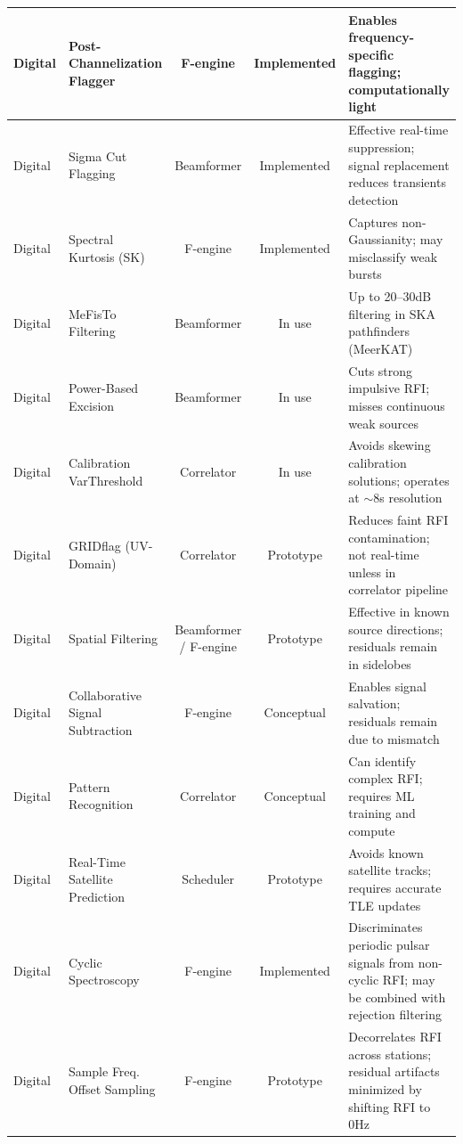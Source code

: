 \documentclass[11pt]{article}
\begin{document}
\begin{table}[htbp]
{\begin{tabular}{|l|l|c|c|p{5.7cm}|}
Digital & Post-Channelization Flagger & F-engine & Implemented & Enables frequency-specific flagging; computationally light \\ \hline
Digital & Sigma Cut Flagging & Beamformer & Implemented & Effective real-time suppression; signal replacement reduces transients detection  \\ \hline
Digital & Spectral Kurtosis (SK) & F-engine & Implemented & Captures non-Gaussianity; may misclassify weak bursts \\ \hline
Digital & MeFisTo Filtering & Beamformer & In use & Up to 20–30dB filtering in SKA pathfinders (MeerKAT) \\ \hline
Digital & Power-Based Excision & Beamformer & In use & Cuts strong impulsive RFI; misses continuous weak sources \\ \hline
Digital & Calibration VarThreshold & Correlator & In use & Avoids skewing calibration solutions; operates at $\sim$8s resolution \\ \hline
Digital & GRIDflag (UV-Domain) & Correlator & Prototype & Reduces faint RFI contamination; not real-time unless in correlator pipeline  \\ \hline
Digital & Spatial Filtering & Beamformer / F-engine & Prototype & Effective in known source directions; residuals remain in sidelobes \\ \hline
Digital & Collaborative Signal Subtraction & F-engine & Conceptual & Enables signal salvation; residuals remain due to mismatch  \\ \hline
Digital & Pattern Recognition & Correlator & Conceptual & Can identify complex RFI; requires ML training and compute \\ \hline
Digital & Real-Time Satellite Prediction & Scheduler & Prototype & Avoids known satellite tracks; requires accurate TLE updates \\ \hline
Digital & Cyclic Spectroscopy & F-engine & Implemented & Discriminates periodic pulsar signals from non-cyclic RFI; may be combined with rejection filtering  \\ \hline
Digital & Sample Freq. Offset Sampling & F-engine & Prototype & Decorrelates RFI across stations; residual artifacts minimized by shifting RFI to 0Hz  \\ \hline
  \end{tabular}
}
\end{table}
\end{document}
